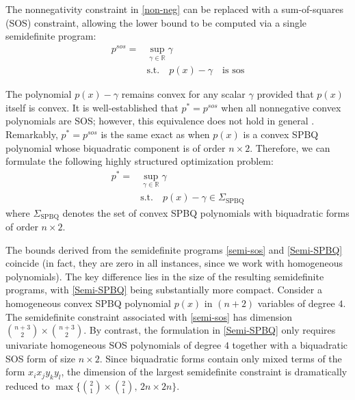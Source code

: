 \documentclass[12pt]{elsarticle}
\theoremstyle{definition}
\begin{document}
The nonnegativity constraint in \eqref{non-neg} can be replaced with a sum-of-squares (SOS) constraint, allowing the lower bound to be computed via a single semidefinite program:
\begin{equation}\label{semi-sos}
\begin{aligned}
    p^{sos} = &\sup_{\gamma\in \mathbb{R}} \gamma\\
    & \text{s.t.}\quad  p(x) - \gamma \quad \text{is sos}
    \end{aligned}
\end{equation}

The polynomial $p(x) - \gamma$ remains convex for any scalar $\gamma$ provided that $p(x)$ itself is convex. It is well-established that $p^*=p^{sos}$ when all nonnegative convex polynomials are SOS; however, this equivalence does not hold in general \cite{blekherman2009convex}. Remarkably, $p^* = p^{sos}$ is the same exact as when $p(x)$ is a convex SPBQ polynomial whose biquadratic component is of order $n\times 2$. Therefore, we can formulate the following highly structured optimization problem:
\begin{equation}\label{Semi-SPBQ}
    \begin{aligned}
        p^* = &\sup_{\gamma\in \mathbb{R}} \gamma\\
    & \text{s.t.}\quad  p(x) - \gamma \in \Sigma_{\text{SPBQ}}
    \end{aligned}
\end{equation}
where $\Sigma_{\text{SPBQ}}$ denotes the set of convex SPBQ polynomials with biquadratic forms of order $n\times 2$.

The bounds derived from the semidefinite programs \eqref{semi-sos} and \eqref{Semi-SPBQ} coincide (in fact, they are zero in all instances, since we work with homogeneous polynomials). The key difference lies in the size of the resulting semidefinite programs, with \eqref{Semi-SPBQ} being substantially more compact. Consider a homogeneous convex SPBQ polynomial $p(x)$ in $(n+2)$ variables of degree $4$. The semidefinite constraint associated with \eqref{semi-sos} has dimension $\binom{n+3}{2}\times \binom{n+3}{2}$. By contrast, the formulation in \eqref{Semi-SPBQ} only requires univariate homogeneous SOS polynomials of degree $4$ together with a biquadratic SOS form of size $n\times 2$. Since biquadratic forms contain only mixed terms of the form $x_ix_jy_ky_l$, the dimension of the largest semidefinite constraint is dramatically reduced to $\max\{\binom{2}{1}\times \binom{2}{1},\,2n\times 2n\}$.
\end{document}
